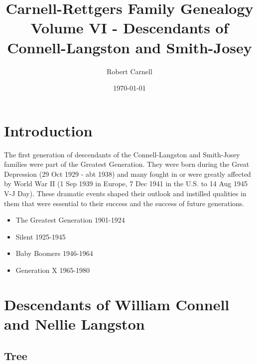 \documentclass[11pt,letter]{book}
\title{\bf Carnell-Rettgers Family Genealogy \\
       \large Volume VI - Descendants of Connell-Langston and Smith-Josey}
\author{Robert Carnell}
\date{\today}
\begin{document}
\frontmatter
\maketitle
\tableofcontents
\mainmatter
\chapter{Introduction}

The first generation of descendants of the Connell-Langston and Smith-Josey families were part of the Greatest Generation.  They were born during the Great Depression (29 Oct 1929 - abt 1938) and many fought in or were greatly affected by World War II (1 Sep 1939 in Europe, 7 Dec 1941 in the U.S. to 14 Aug 1945 V-J Day).  These dramatic events shaped their outlook and instilled qualities in them that were essential to their success and the success of future generations.

\begin{itemize}
\item The Greatest Generation 1901-1924
\item Silent 1925-1945
\item Baby Boomers 1946-1964
\item Generation X 1965-1980
\end{itemize}

\chapter{Descendants of William Connell and Nellie Langston}

\section{Tree}
\end{document}
